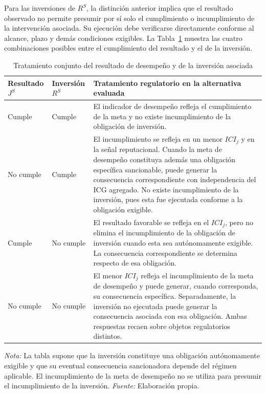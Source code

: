 Para las inversiones de \(R^{S}\), la distinción anterior implica que el resultado observado no permite presumir por sí solo el cumplimiento o incumplimiento de la intervención asociada. Su ejecución debe verificarse directamente conforme al alcance, plazo y demás condiciones exigibles. La Tabla~\ref{tab:resultado_inversion_consecuencias} muestra las cuatro combinaciones posibles entre el cumplimiento del resultado y el de la inversión.

\begin{table}[!t]
\centering
\caption{Tratamiento conjunto del resultado de desempeño y de la inversión asociada}
\label{tab:resultado_inversion_consecuencias}
\small
\renewcommand{\arraystretch}{1.20}
\setlength{\tabcolsep}{5pt}
\begin{tabularx}{\textwidth}{
>{\raggedright\arraybackslash}p{2.7cm}
>{\raggedright\arraybackslash}p{2.7cm}
>{\raggedright\arraybackslash}X}
\hline
\textbf{Resultado \(J^{S}\)} &
\textbf{Inversión \(R^{S}\)} &
\textbf{Tratamiento regulatorio en la alternativa evaluada} \\
\hline
Cumple &
Cumple &
El indicador de desempeño refleja el cumplimiento de la meta y no existe incumplimiento de la obligación de inversión. \\
No cumple &
Cumple &
El incumplimiento se refleja en un menor \(ICI_j\) y en la señal reputacional. Cuando la meta de desempeño constituya además una obligación específica sancionable, puede generar la consecuencia correspondiente con independencia del ICG agregado. No existe incumplimiento de la inversión, pues esta fue ejecutada conforme a la obligación exigible. \\
Cumple &
No cumple &
El resultado favorable se refleja en el \(ICI_j\), pero no elimina el incumplimiento de la obligación de inversión cuando esta sea autónomamente exigible. La consecuencia correspondiente se determina respecto de esa obligación. \\
No cumple &
No cumple &
El menor \(ICI_j\) refleja el incumplimiento de la meta de desempeño y puede generar, cuando corresponda, su consecuencia específica. Separadamente, la inversión no ejecutada puede generar la consecuencia asociada con esa obligación. Ambas respuestas recaen sobre objetos regulatorios distintos. \\
\hline
\end{tabularx}
\begin{minipage}{\textwidth}
\footnotesize
\textit{Nota:} La tabla supone que la inversión constituye una obligación autónomamente exigible y que su eventual consecuencia sancionadora depende del régimen aplicable. El incumplimiento de la meta de desempeño no se utiliza para presumir el incumplimiento de la inversión. \textit{Fuente:} Elaboración propia.
\end{minipage}
\end{table}

